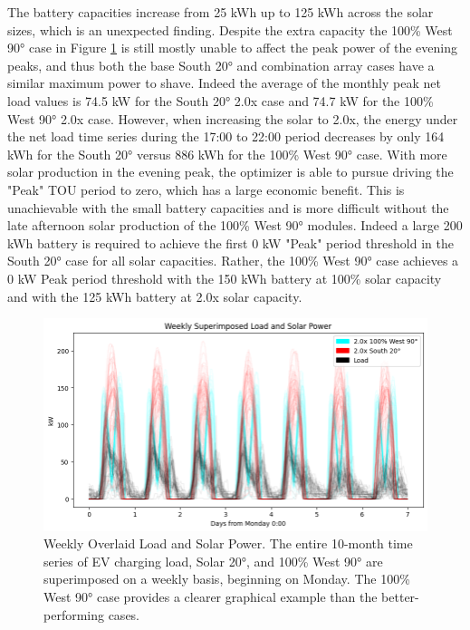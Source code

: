 \documentclass[journal,article,submit,pdftex,moreauthors]{Definitions/mdpi}
\begin{document}
The battery capacities increase from 25 kWh up to 125 kWh across the solar sizes, which is an unexpected finding. Despite the extra capacity the 100\% West 90° case in Figure \ref{fig:weekly-load-solar} is still mostly unable to affect the peak power of the evening peaks, and thus both the base South 20° and combination array cases have a similar maximum power to shave. Indeed the average of the monthly peak net load values is 74.5 kW for the South 20° 2.0x case and 74.7 kW for the 100\% West 90° 2.0x case. However, when increasing the solar to 2.0x, the energy under the net load time series during the 17:00 to 22:00 period decreases by only 164 kWh for the South 20° versus 886 kWh for the 100\% West 90° case. With more solar production in the evening peak, the optimizer is able to pursue driving the "Peak" TOU period to zero, which has a large economic benefit. This is unachievable with the small battery capacities and is more difficult without the late afternoon solar production of the 100\% West 90° modules. Indeed a large 200 kWh battery is required to achieve the first 0 kW "Peak" period threshold in the South 20° case for all solar capacities. Rather, the 100\% West 90° case achieves a 0 kW Peak period threshold with the 150 kWh battery at 100\% solar capacity and with the 125 kWh battery at 2.0x solar capacity.

\begin{figure}
  \centering
  \includegraphics[width=\linewidth]{./images/weekly load solar.png}
  \caption{Weekly Overlaid Load and Solar Power. The entire 10-month time series of EV charging load, Solar 20°, and 100\% West 90° are superimposed on a weekly basis, beginning on Monday. The 100\% West 90° case provides a clearer graphical example than the better-performing cases.}
  \label{fig:weekly-load-solar}
\end{figure}
\end{document}
